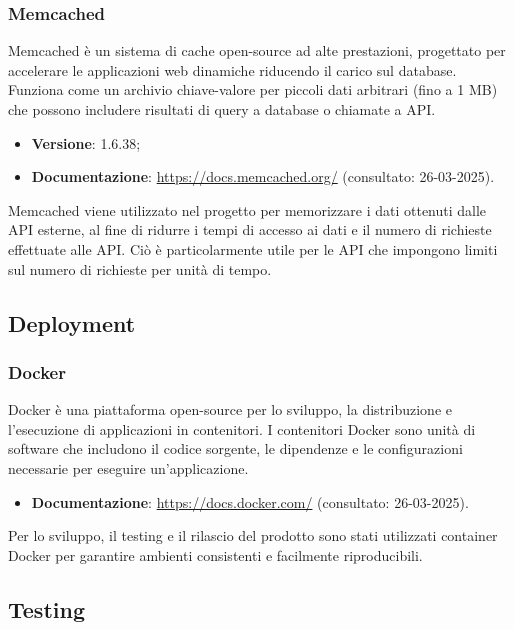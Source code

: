 \subsubsection{Memcached}
Memcached è un sistema di cache open-source ad alte prestazioni, progettato per
accelerare le applicazioni web dinamiche riducendo il carico sul database.
Funziona come un archivio chiave-valore per piccoli dati arbitrari (fino a 1
MB) che possono includere risultati di query a database o chiamate a API.
\begin{itemize}
    \item \textbf{Versione}: 1.6.38;
    \item \textbf{Documentazione}: \url{https://docs.memcached.org/} (consultato:
          26-03-2025).
\end{itemize}
Memcached viene utilizzato nel progetto per memorizzare i dati ottenuti dalle API esterne,
al fine di ridurre i tempi di accesso ai dati e il numero di richieste
effettuate alle API. Ciò è particolarmente utile per le API che impongono limiti sul numero di richieste per unità di tempo.

\subsection{Deployment}
\subsubsection{Docker}
Docker è una piattaforma open-source per lo sviluppo, la distribuzione e
l'esecuzione di applicazioni in contenitori. I contenitori Docker sono unità di software che includono il codice sorgente, le dipendenze e le
configurazioni necessarie per eseguire un'applicazione.
\begin{itemize}
    \item \textbf{Documentazione}: \url{https://docs.docker.com/} (consultato:
          26-03-2025).
\end{itemize}
Per lo sviluppo, il testing e il rilascio del prodotto sono stati utilizzati container Docker per garantire ambienti consistenti e facilmente riproducibili.

\subsection{Testing}
